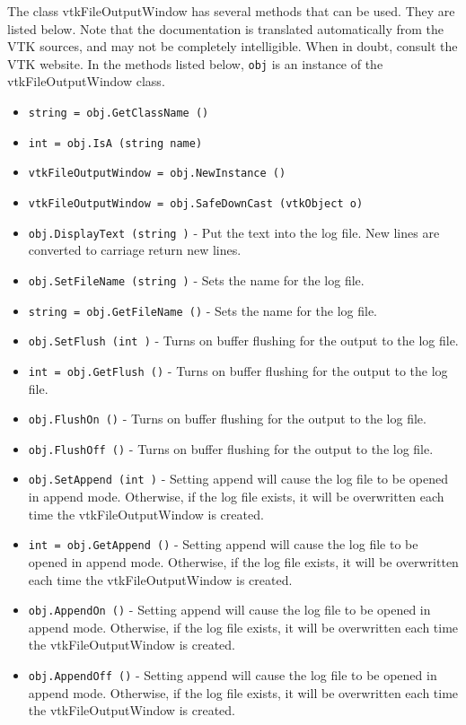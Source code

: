 The class vtkFileOutputWindow has several methods that can be used.
  They are listed below.
Note that the documentation is translated automatically from the VTK sources,
and may not be completely intelligible.  When in doubt, consult the VTK website.
In the methods listed below, \verb|obj| is an instance of the vtkFileOutputWindow class.
\begin{itemize}
\item  \verb|string = obj.GetClassName ()|

\item  \verb|int = obj.IsA (string name)|

\item  \verb|vtkFileOutputWindow = obj.NewInstance ()|

\item  \verb|vtkFileOutputWindow = obj.SafeDownCast (vtkObject o)|

\item  \verb|obj.DisplayText (string )| -  Put the text into the log file.
 New lines are converted to carriage return new lines.

\item  \verb|obj.SetFileName (string )| -  Sets the name for the log file.

\item  \verb|string = obj.GetFileName ()| -  Sets the name for the log file.

\item  \verb|obj.SetFlush (int )| -  Turns on buffer flushing for the output 
 to the log file.

\item  \verb|int = obj.GetFlush ()| -  Turns on buffer flushing for the output 
 to the log file.

\item  \verb|obj.FlushOn ()| -  Turns on buffer flushing for the output 
 to the log file.

\item  \verb|obj.FlushOff ()| -  Turns on buffer flushing for the output 
 to the log file.

\item  \verb|obj.SetAppend (int )| -  Setting append will cause the log file to be
 opened in append mode.  Otherwise, if the log file exists,
 it will be overwritten each time the vtkFileOutputWindow
 is created.

\item  \verb|int = obj.GetAppend ()| -  Setting append will cause the log file to be
 opened in append mode.  Otherwise, if the log file exists,
 it will be overwritten each time the vtkFileOutputWindow
 is created.

\item  \verb|obj.AppendOn ()| -  Setting append will cause the log file to be
 opened in append mode.  Otherwise, if the log file exists,
 it will be overwritten each time the vtkFileOutputWindow
 is created.

\item  \verb|obj.AppendOff ()| -  Setting append will cause the log file to be
 opened in append mode.  Otherwise, if the log file exists,
 it will be overwritten each time the vtkFileOutputWindow
 is created.

\end{itemize}

